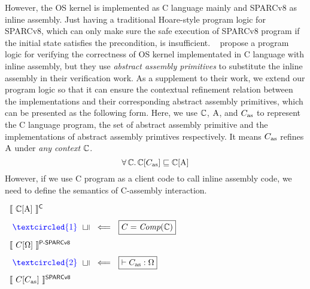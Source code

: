 However, the OS kernel is implemented as
C language mainly and SPARCv8 as inline assembly.
Just having a traditional Hoare-style
program logic for SPARCv8, which can only make sure
the safe execution of SPARCv8 program if the initial
state satisfies the precondition, is insufficient.
~\cite{Xu16cav} propose a program logic for
verifying the correctness of OS kernel implementated in
C language with inline assembly,
but they use {\em abstract assembly primitives} to
substitute the inline assembly in their verification work.
As a supplement to their work, we extend our
program logic so that it can ensure the
contextual refinement relation between the implementations
and their corresponding abstract assembly primitives,
which can be presented as the following form. Here,
we use $\mathbb{C}$, $\text{A}$, and $C_{\text{as}}$ to represent
the C language program, the set of abstract assembly
primitive and the implementations of
abstract assembly primtives respectively.
It means $C_{\text{as}}$ refines $\text{A}$ under
\textit{any context} $\mathbb{C}$.
\[
    \forall \, \mathbb{C}. \,
    \mathbb{C}[C_{\text{as}}] \sqsubseteq \mathbb{C}[\text{A}]
\]
However, if we use C program as a client code to
call inline assembly code, we need to define the
semantics of C-assembly interaction.
\begin{center}
    $
        \begin{array}{l}
            \semantics{\Clang[\AbsPrimC]}^{\textsf{C}}
            \\
            \\[-5pt]
            \
            {\color{blue} \textcircled{1}} \ \
            \rotatebox[origin=c]{90}{$\refine$} \ \
            \Longleftarrow \ \
            \boxed{C = \textit{Comp}(\Clang)}
            \\
            \\[-5pt]
            \semantics{\code[\hprimset]}^{\textsf{P-SPARCv8}}
            \\
            \\[-5pt]
            \
            {\color{blue} \textcircled{2}} \ \
            \rotatebox[origin=c]{90}{$\refine$} \ \
            \Longleftarrow \ \
            \boxed{\vdash\asmimp:\hprimset}
            \\
            \\[-5pt]
            \semantics{\code[\asmimp]}^{\textsf{SPARCv8}}
        \end{array}
    $
    \label{fig:idea to establish contextual refinement}
\end{center}

